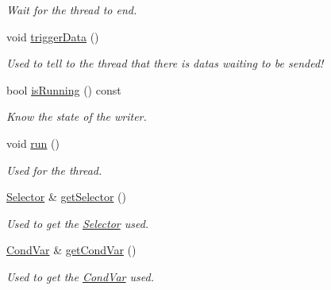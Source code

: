 \begin{DoxyCompactItemize}
\begin{DoxyCompactList}\small\item\em Wait for the thread to end. \end{DoxyCompactList}\item 
\hypertarget{classmognetwork_1_1_tcp_a_s_i_o_writer_a69906d01efaf03f6a2d5987e2f54ba87}{void \hyperlink{classmognetwork_1_1_tcp_a_s_i_o_writer_a69906d01efaf03f6a2d5987e2f54ba87}{trigger\-Data} ()}\label{classmognetwork_1_1_tcp_a_s_i_o_writer_a69906d01efaf03f6a2d5987e2f54ba87}

\begin{DoxyCompactList}\small\item\em Used to tell to the thread that there is datas waiting to be sended! \end{DoxyCompactList}\item 
bool \hyperlink{classmognetwork_1_1_tcp_a_s_i_o_writer_a0117301d2bb36f3d2b44039e16dd286d}{is\-Running} () const 
\begin{DoxyCompactList}\small\item\em Know the state of the writer. \end{DoxyCompactList}\item 
\hypertarget{classmognetwork_1_1_tcp_a_s_i_o_writer_ab3d1361bd19d8d09b278f9a361b058ea}{void \hyperlink{classmognetwork_1_1_tcp_a_s_i_o_writer_ab3d1361bd19d8d09b278f9a361b058ea}{run} ()}\label{classmognetwork_1_1_tcp_a_s_i_o_writer_ab3d1361bd19d8d09b278f9a361b058ea}

\begin{DoxyCompactList}\small\item\em Used for the thread. \end{DoxyCompactList}\item 
\hyperlink{classmognetwork_1_1_selector}{Selector} \& \hyperlink{classmognetwork_1_1_tcp_a_s_i_o_writer_ab7f6474ccd1082d2fc9f8acd2be87d3c}{get\-Selector} ()
\begin{DoxyCompactList}\small\item\em Used to get the \hyperlink{classmognetwork_1_1_selector}{Selector} used. \end{DoxyCompactList}\item 
\hyperlink{classmognetwork_1_1_cond_var}{Cond\-Var} \& \hyperlink{classmognetwork_1_1_tcp_a_s_i_o_writer_ad312e3f3f5bd50ca728fec3e1c4476e6}{get\-Cond\-Var} ()
\begin{DoxyCompactList}\small\item\em Used to get the \hyperlink{classmognetwork_1_1_cond_var}{Cond\-Var} used. \end{DoxyCompactList}\end{DoxyCompactItemize}


